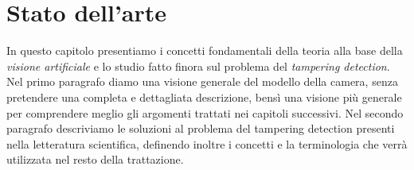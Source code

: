 \chapter{Stato dell'arte}
\label{StatoArte}
\thispagestyle{empty}

\vspace{0.5cm}

\noindent In questo capitolo presentiamo i concetti fondamentali della teoria alla base della \textit{visione artificiale} e lo studio fatto finora sul problema del \textit{tampering detection}.
Nel primo paragrafo diamo una visione generale del modello della camera, senza pretendere una completa e dettagliata descrizione, bens\`i una visione pi\`u generale per comprendere meglio gli argomenti trattati nei capitoli successivi.
Nel secondo paragrafo descriviamo le soluzioni al problema del tampering detection presenti nella letteratura scientifica, definendo inoltre i concetti e la terminologia che verr\`a utilizzata nel resto della trattazione.
